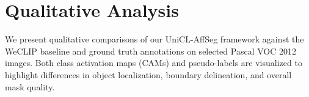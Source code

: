 \section{Qualitative Analysis}
\label{sec:qualitative_analysis}

We present qualitative comparisons of our UniCL-AffSeg framework against the WeCLIP baseline and ground truth annotations on selected Pascal VOC 2012 images. Both class activation maps (CAMs) and pseudo-labels are visualized to highlight differences in object localization, boundary delineation, and overall mask quality.




